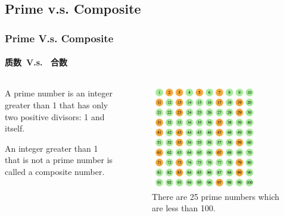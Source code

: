 \documentclass[
	11pt, %
]{beamer}
\begin{document}
\subsection{Prime v.s. Composite}
\begin{frame}
	\frametitle{Prime V.s. Composite}
	\framesubtitle{质数\  V.s. \ 合数}
	\begin{columns}[t]
	\begin{column}{0.45\textwidth}
	\begin{definition}
		  A \alert{prime number} is an integer \alert{greater than 1} that has only two positive divisors: 1 and itself.
	  \end{definition}

	  \begin{definition}
		  An integer \alert{greater than 1} that is \alert{not} a prime number is called a \alert{composite} number.
	  \end{definition}
	\end{column}
	\begin{column}{0.5\textwidth}
	  	\begin{figure}
		\includegraphics[width=0.8\textwidth]{Prime_Numbers.png}
		\caption{There are 25 prime numbers which are less than 100.}
	\end{figure}
	\end{column}
	\end{columns}


\end{frame}

\end{document}
